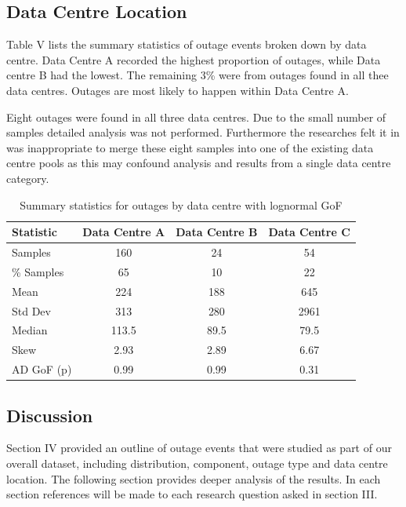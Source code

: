 \subsection{Data Centre Location}

Table V lists the summary statistics of outage events broken down by data centre. Data Centre A recorded the highest proportion of outages, while Data centre B had the lowest. The remaining 3\% were from outages found in all thee data centres.  Outages are most likely to happen within Data Centre A.

Eight outages were found in all three data centres. Due to the small number of samples detailed analysis was not performed. Furthermore the researches felt it in was inappropriate to merge these eight samples into one of the existing data centre pools as this may confound analysis and results from a single data centre category. \par

\begin {table}
\caption {Summary statistics for outages by data centre with lognormal GoF} 
\begin{center}
\begin{tabular}{l | c | c | c} Statistic & Data Centre A & Data Centre B  & Data Centre C 
\\ \hline Samples & 160 & 24 & 54 
\\ \% Samples & 65 & 10 & 22
\\ Mean & 224	& 188 	& 645
\\ Std Dev & 313	& 280 & 2961
\\ Median & 113.5	& 89.5	& 79.5
\\ Skew & 2.93	& 2.89	& 6.67 
\\AD GoF (p) & 0.99 & 0.99 & 0.31 
\end{tabular}
\end{center}
\end{table}

\subsection{Discussion}

Section IV provided an outline of outage events that were studied as part of our overall dataset, including distribution, component, outage type and data centre location. The following section provides deeper analysis of the results. In each section references will be made to each research question asked in section III.

